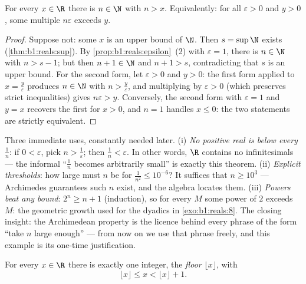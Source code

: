 \begin{theorem}\label{thm:b1:reals:archimedes}
For every $x \in \R$ there is $n \in \N$ with $n > x$. Equivalently:
for all $\varepsilon > 0$ and $y > 0$, some multiple $n\varepsilon$
exceeds $y$.
\end{theorem}

\begin{proof}
Suppose not: some $x$ is an upper bound of $\N$. Then $s = \sup \N$
exists (\cref{thm:b1:reals:sup}). By
\cref{prop:b1:reals:epsilon}~(2) with $\varepsilon = 1$, there is $n
\in \N$ with $n > s - 1$; but then $n + 1 \in \N$ and $n + 1 > s$,
contradicting that $s$ is an upper bound. For the second form,
let $\varepsilon > 0$ and $y > 0$: the first form applied to $x
= \frac{y}{\varepsilon}$ produces $n \in \N$ with $n >
\frac{y}{\varepsilon}$, and multiplying by $\varepsilon > 0$
(which preserves strict inequalities) gives $n\varepsilon > y$.
Conversely, the second form with $\varepsilon = 1$ and $y = x$
recovers the first for $x > 0$, and $n = 1$ handles $x \leq 0$:
the two statements are strictly equivalent.
\end{proof}

\begin{example}\label{ex:b1:reals:archimedeswork}
Three immediate uses, constantly needed later. (i) \emph{No
positive real is below every $\frac1n$}: if $0 < \varepsilon$,
pick $n > \frac1\varepsilon$; then $\frac1n < \varepsilon$. In
other words, $\R$ contains no infinitesimals --- the informal
``$\frac1n$ becomes arbitrarily small'' is exactly this theorem.
(ii) \emph{Explicit thresholds}: how large must $n$ be for
$\frac{1}{n^2} \leq 10^{-6}$? It suffices that $n \geq 10^3$
--- Archimedes guarantees such $n$ exist, and the algebra
locates them. (iii) \emph{Powers beat any bound}: $2^n \geq n +
1$ (induction), so for every $M$ some power of $2$ exceeds $M$:
the geometric growth used for the dyadics in
\cref{exo:b1:reals:8}. The closing insight: the Archimedean
property is the licence behind every phrase of the form ``take
$n$ large enough'' --- from now on we use that phrase freely,
and this example is its one-time justification.
\end{example}

\begin{theorem}\label{thm:b1:reals:floor}
For every $x \in \R$ there is exactly one integer, the
\emph{floor} $\lfloor x \rfloor$, with
\[
\lfloor x \rfloor \leq x < \lfloor x \rfloor + 1 .
\]
\end{theorem}

